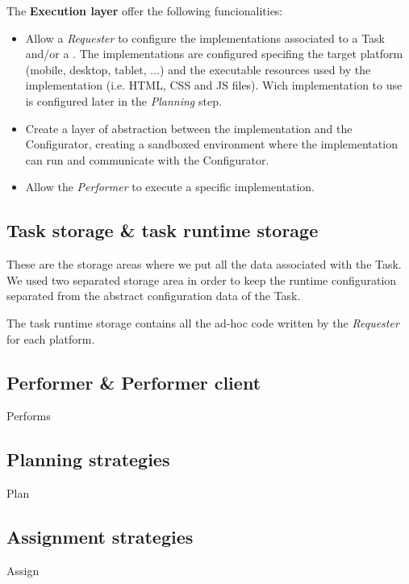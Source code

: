 The \textbf{Execution layer} offer the following funcionalities:
\begin{itemize}
	\item Allow a \emph{Requester} to configure the implementations associated to
	a Task and/or a \utask{}. The implementations are configured specifing the
	target platform (mobile, desktop, tablet, ...) and the executable resources
	used by the implementation (i.e. HTML, CSS and JS files). Wich implementation
	to use is configured later in the \emph{Planning} step.

	\item Create a layer of abstraction between the implementation and the
	Configurator, creating a sandboxed environment where the implementation can
	run and communicate with the Configurator.

	\item Allow the \emph{Performer} to execute a specific \utask{} implementation.
\end{itemize}






\subsection{Task storage \& task runtime storage}
These are the storage areas where we put all the data associated with the Task.
We used two separated storage area in order to keep the runtime configuration
separated from the abstract configuration data of the Task.

The task runtime storage contains all the ad-hoc code written by the \emph{Requester}
for each platform. 


\subsection{Performer \& Performer client}
\todo
Performs
\subsection{Planning strategies}
\todo
Plan
\subsection{Assignment strategies}
\todo
Assign